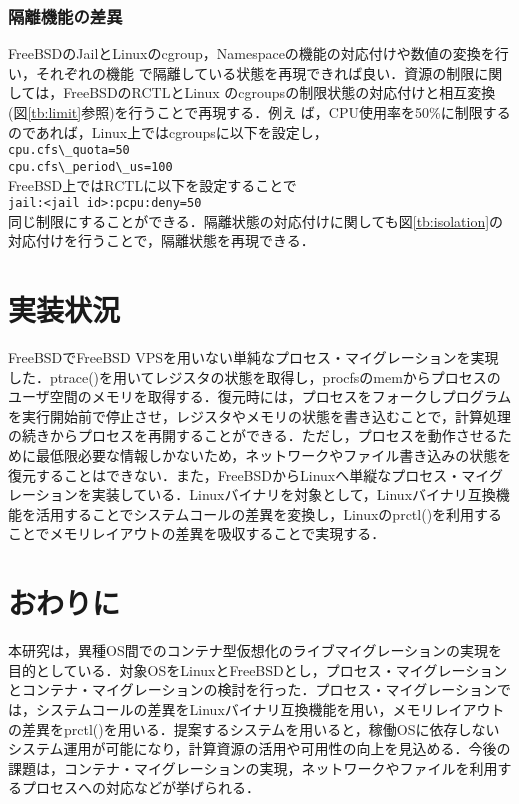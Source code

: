 \documentclass[11pt]{jarticle}
\begin{document}
\subsubsection{隔離機能の差異}
FreeBSDのJailとLinuxのcgroup，Namespaceの機能の対応付けや数値の変換を行い，それぞれの機能
で隔離している状態を再現できれば良い．資源の制限に関しては，FreeBSDのRCTLとLinux
のcgroupsの制限状態の対応付けと相互変換(図\ref{tb:limit}参照)を行うことで再現する．例え
ば，CPU使用率を50\%に制限するのであれば，Linux上ではcgroupsに以下を設定し，\\
\verb|cpu.cfs\_quota=50|\\
\verb|cpu.cfs\_period\_us=100|\\
FreeBSD上ではRCTLに以下を設定することで\\
\verb|jail:<jail id>:pcpu:deny=50|\\
同じ制限にすることができる．隔離状態の対応付けに関しても図\ref{tb:isolation}の対応付けを行うことで，隔離状態を再現できる．

\section{実装状況}
FreeBSDでFreeBSD VPSを用いない単純なプロセス・マイグレーションを実現した．ptrace()を用いてレジスタの状態を取得し，procfsのmemからプロセスのユーザ空間のメモリを取得する．復元時には，プロセスをフォークしプログラムを実行開始前で停止させ，レジスタやメモリの状態を書き込むことで，計算処理の続きからプロセスを再開することができる．ただし，プロセスを動作させるために最低限必要な情報しかないため，ネットワークやファイル書き込みの状態を復元することはできない．また，FreeBSDからLinuxへ単縦なプロセス・マイグレーションを実装している．Linuxバイナリを対象として，Linuxバイナリ互換機能を活用することでシステムコールの差異を変換し，Linuxのprctl()を利用することでメモリレイアウトの差異を吸収することで実現する．

\section{おわりに}
本研究は，異種OS間でのコンテナ型仮想化のライブマイグレーションの実現を目的としている．対象OSをLinuxとFreeBSDとし，プロセス・マイグレーションとコンテナ・マイグレーションの検討を行った．プロセス・マイグレーションでは，システムコールの差異をLinuxバイナリ互換機能を用い，メモリレイアウトの差異をprctl()を用いる．提案するシステムを用いると，稼働OSに依存しないシステム運用が可能になり，計算資源の活用や可用性の向上を見込める．今後の課題は，コンテナ・マイグレーションの実現，ネットワークやファイルを利用するプロセスへの対応などが挙げられる．
\end{document}
